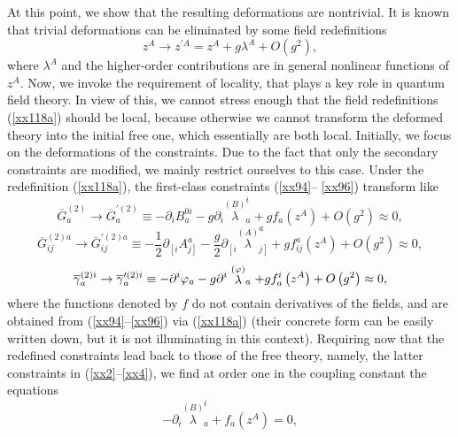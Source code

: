 \documentclass[a4paper,12pt]{article}
\begin{document}
At this point, we show that the resulting deformations are nontrivial. It is
known that trivial deformations can be eliminated by some field
redefinitions 
\begin{equation}
z^{A}\rightarrow z^{\prime A}=z^{A}+g\lambda ^{A}+O\left( g^{2}\right) ,
\label{xx118a}
\end{equation}
where $\lambda ^{A}$ and the higher-order contributions are in general
nonlinear functions of $z^{A}$. Now, we invoke the requirement of locality,
that plays a key role in quantum field theory. In view of this, we cannot
stress enough that the field redefinitions (\ref{xx118a}) should be local,
because otherwise we cannot transform the deformed theory into the initial
free one, which essentially are both local. Initially, we focus on the
deformations of the constraints. Due to the fact that only the secondary
constraints are modified, we mainly restrict ourselves to this case. Under
the redefinition (\ref{xx118a}), the first-class constraints (\ref{xx94}--%
\ref{xx96}) transform like
\begin{equation}
\overline{G}_{a}^{(2)}\rightarrow \overline{G}_{a}^{\prime (2)}\equiv
-\partial _{i}B_{a}^{0i}-g\partial _{i}\stackrel{(B)}{\lambda }%
_{a}^{i}+gf_{a}\left( z^{A}\right) +O\left( g^{2}\right) \approx 0,
\label{xx118b}
\end{equation}
\begin{equation}
\overline{G}_{ij}^{(2)a}\rightarrow \overline{G}_{ij}^{\prime (2)a}\equiv -%
\frac{1}{2}\partial _{\left[ i\right. }A_{\left. j\right] }^{a}-\frac{g}{2}%
\partial _{\left[ i\right. }\stackrel{(A)}{\lambda }_{\left. j\right]
}^{a}+gf_{ij}^{a}\left( z^{A}\right) +O\left( g^{2}\right) \approx 0,
\label{xx118c}
\end{equation}
\begin{equation}
\overline{\gamma }_{a}^{(2)i}\rightarrow \overline{\gamma }_{a}^{\prime
(2)i}\equiv -\partial ^{i}\varphi _{a}-g\partial ^{i}\stackrel{(\varphi )}{%
\lambda }_{a}+gf_{a}^{i}\left( z^{A}\right) +O\left( g^{2}\right) \approx 0,
\label{xx118d}
\end{equation}
where the functions denoted by $f$ do not contain derivatives of the fields,
and are obtained from (\ref{xx94}--\ref{xx96}) via (\ref{xx118a}) (their
concrete form can be easily written down, but it is not illuminating in this
context). Requiring now that the redefined constraints lead back to those of
the free theory, namely, the latter constraints in (\ref{xx2}--\ref{xx4}),
we find at order one in the coupling constant the equations
\begin{equation}
-\partial _{i}\stackrel{(B)}{\lambda }_{a}^{i}+f_{a}\left( z^{A}\right) =0,
\label{xx118e}
\end{equation}
\end{document}

